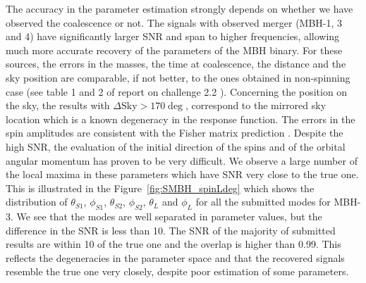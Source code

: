\documentclass{iopart}
\begin{document}
The accuracy in the parameter estimation strongly depends on whether we have observed the coalescence or not.
The signals with observed merger (MBH-1, 3 and 4) have significantly larger SNR and span to higher frequencies, 
allowing much more accurate recovery of the parameters of the MBH binary. 
 For these sources, the errors in the masses, the time at coalescence, the distance and the sky position are comparable, if not better, to the ones obtained in non-spinning case (see table 1 and 2 of report on challenge 2.2 \cite{mldcamaldi2}). Concerning the position on the sky, the results with  $\Delta \textrm{Sky} > 170 \deg$, correspond to the mirrored sky location which is a known degeneracy in the response function. The errors in the spin amplitudes
  are consistent with the Fisher matrix prediction \cite{SpinBBHLangHugues}.  Despite the high SNR, the evaluation of the initial direction of the spins and of the orbital angular momentum has proven to be very difficult.  We observe a large number of the local maxima in these parameters which have SNR very close to the true one. This is illustrated in the Figure~\ref{fig:SMBH_spinLdeg} which shows the distribution of $\theta_{S1}$, $\phi_{S1}$, $\theta_{S2}$, $\phi_{S2}$, $\theta_{L}$ and $\phi_{L}$ for all the submitted modes for MBH-3. We see that the modes are well separated in parameter values, but the difference in the SNR is less than 10. The SNR of the majority of submitted results are within 10 of the true one and the overlap is higher than 0.99.
This reflects the degeneracies in the parameter space and that the recovered signals resemble the true one very closely, despite poor estimation of some parameters.
\end{document}

